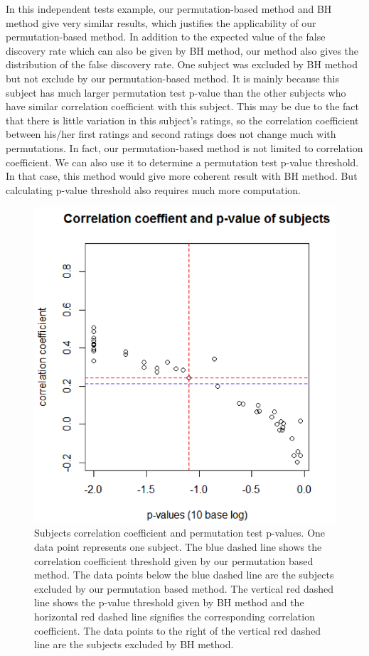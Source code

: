 \documentclass[11pt,notitlepage]{article}
\begin{document}
In this independent tests example, our permutation-based method and BH method give very similar results, which justifies the applicability of our permutation-based method. In addition to the expected value of the false discovery rate which can also be given by BH method, our method also gives the distribution of the false discovery rate. One subject was excluded by BH method but not exclude by our permutation-based method. It is mainly because this subject has much larger permutation test p-value than the other subjects who have similar correlation coefficient with this subject. This may be due to the fact that there is little variation in this subject's ratings, so the correlation coefficient between his/her first ratings and second ratings does not change much with permutations. In fact, our permutation-based method is not limited to correlation coefficient. We can also use it to determine a permutation test p-value threshold. In that case, this method would give more coherent result with BH method. But calculating p-value threshold also requires much more computation.


\begin{figure}[h c] %
\centering
\includegraphics[scale = .70]{Figures/Part3_3.png}
\caption{\footnotesize Subjects correlation coefficient and permutation test p-values. One data point represents one subject. The blue dashed line shows the correlation coefficient threshold given by our permutation based method. The data points below the blue dashed line are the subjects excluded by our permutation based method. The vertical red dashed line shows the p-value threshold given by BH method and the horizontal red dashed line signifies the corresponding correlation coefficient. The data points to the right of the vertical red dashed line are the subjects excluded by BH method.}
\end{figure}
\end{document}
